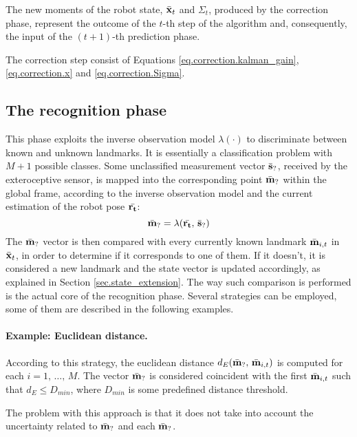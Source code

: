 	The new moments of the robot state, $\bar{\boldsymbol{\mathrm{{x}}}}_t$ and $\Sigma_t$, produced by the correction phase, represent the outcome of the $t$-th step of the \EKF{} algorithm and, consequently, the input of the $(t+1)$-th prediction phase.
	
	\vspace{1cm}
	\begin{recap}
		The correction step consist of Equations \ref{eq.correction.kalman_gain}, \ref{eq.correction.x} and \ref{eq.correction.Sigma}.
	\end{recap}
	

\subsection{The recognition phase}
	This phase exploits the inverse observation model $\lambda(\cdot)$ to discriminate between known and unknown landmarks. 
	It is essentially a classification problem with $M + 1$ possible classes.
	Some unclassified measurement vector $\bar{\boldsymbol{\mathrm{{s}}}}_?$, received by the exteroceptive sensor, is mapped into the corresponding point $\bar{\boldsymbol{\mathrm{{m}}}}_?$ within the global frame, according to the inverse observation model and the current estimation of the robot pose $\bar{\boldsymbol{\mathrm{{r_t}}}}$:
	\[
		\bar{\boldsymbol{\mathrm{{m}}}}_? = \lambda(\bar{\boldsymbol{\mathrm{{r_t}}}},\, \bar{\boldsymbol{\mathrm{{s}}}}_?)
	\]
	The $\bar{\boldsymbol{\mathrm{{m}}}}_?$ vector is then compared with every currently known landmark $\bar{\boldsymbol{\mathrm{{m}}}}_{i,t}$ in $\bar{\boldsymbol{\mathrm{{x}}}}_t$, in order to determine if it corresponds to one of them. 
	If it doesn't, it is considered a new landmark and the state vector is updated accordingly, as explained in Section \ref{sec.state_extension}.
	The way such comparison is performed is the actual core of the recognition phase. 
	Several strategies can be employed, some of them are described in the following examples.
	
	\paragraph{Example: Euclidean distance.}
		According to this strategy, the euclidean distance $d_E(\bar{\boldsymbol{\mathrm{{m}}}}_?,\,\bar{\boldsymbol{\mathrm{{m}}}}_{i,t})$ is computed for each $i = 1,\, \ldots,\, M$.
		The vector $\bar{\boldsymbol{\mathrm{{m}}}}_?$ is considered coincident with the first $\bar{\boldsymbol{\mathrm{{m}}}}_{i,t}$ such that $d_E \leq D_{min}$, where $D_{min}$ is some predefined distance threshold.
		
		The problem with this approach is that it does not take into account the uncertainty related to $\bar{\boldsymbol{\mathrm{{m}}}}_?$ and each $\bar{\boldsymbol{\mathrm{{m}}}}_?$.
		

